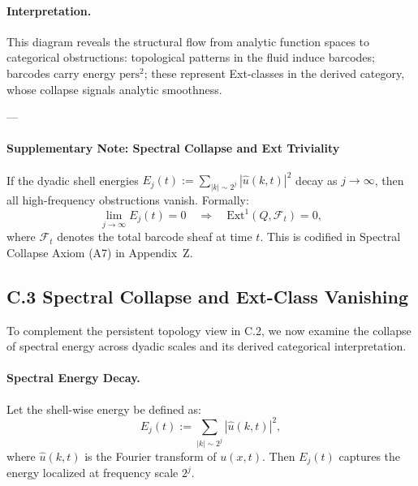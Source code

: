 \documentclass[11pt]{article}
\begin{document}
\begin{center}
\end{center}

\paragraph{Interpretation.}
This diagram reveals the structural flow from analytic function spaces to categorical obstructions:  
topological patterns in the fluid induce barcodes; barcodes carry energy \( \text{pers}^2 \);  
these represent Ext-classes in the derived category, whose collapse signals analytic smoothness.

---

\paragraph{Supplementary Note: Spectral Collapse and Ext Triviality}

If the dyadic shell energies \( E_j(t) := \sum_{|k| \sim 2^j} |\widehat{u}(k,t)|^2 \) decay as \( j \to \infty \),  
then all high-frequency obstructions vanish. Formally:
\[
\lim_{j \to \infty} E_j(t) = 0 
\quad \Rightarrow \quad 
\mathrm{Ext}^1(Q, \mathcal{F}_t) = 0,
\]
where \( \mathcal{F}_t \) denotes the total barcode sheaf at time \( t \).  
This is codified in Spectral Collapse Axiom (A7) in Appendix~Z.



\subsection*{C.3 Spectral Collapse and Ext-Class Vanishing}

To complement the persistent topology view in C.2, we now examine the collapse of spectral energy across dyadic scales and its derived categorical interpretation.

\paragraph{Spectral Energy Decay.}
Let the shell-wise energy be defined as:
\[
E_j(t) := \sum_{|k| \sim 2^j} |\widehat{u}(k,t)|^2,
\]
where \( \widehat{u}(k,t) \) is the Fourier transform of \( u(x,t) \).  
Then \( E_j(t) \) captures the energy localized at frequency scale \( 2^j \).  
\end{document}
